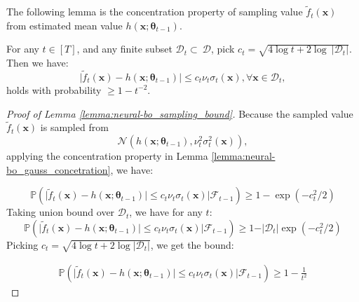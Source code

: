 The following lemma is the concentration property of sampling value $\widetilde{f}_t(\mathbf{x})$ from estimated mean value $h(\mathbf{x}; \boldsymbol{\theta}_{t-1})$.
\begin{lemma}
\label{lemma:neural-bo_sampling_bound}
For any $t \in [T]$, and any finite subset $\mathcal{D}_t \subset\ \mathcal{D}$,  pick $c_t =  \sqrt{4\log t + 2 \log \ \lvert \mathcal D_t \rvert}$. Then we have:  
\[\lvert \widetilde{f}_t(\mathbf{x}) - h(\mathbf{x}; \boldsymbol{\theta}_{t-1}) \rvert \leq c_t\nu_t \sigma_t(\mathbf{x}), \forall \mathbf{x} \in \mathcal{D}_t, \] 
holds with probability $\geq  1-t^{-2}$.
\end{lemma}


\begin{proof}[Proof of Lemma \ref{lemma:neural-bo_sampling_bound}]
    
Because the sampled value $\widetilde{f}_t(\mathbf{x})$ is sampled from  
\[
\mathcal{N}(h(\mathbf{x}; \boldsymbol{\theta}_{t-1}), \nu_t^2\sigma_t^2(\mathbf{x})),
\] 
applying the concentration property in Lemma \ref{lemma:neural-bo_gauss_concetration}, we have:

\[\mathbb{P}(\rvert \widetilde{f}_t(\mathbf{x}) -h(\mathbf{x}; \boldsymbol{\theta}_{t-1}) \lvert \leq c_t \nu_t \sigma_t(\mathbf{x}) \lvert \mathcal{F}_{t-1}) \geq 1-\exp(-c_t^2/2)
\]
Taking union bound over $\mathcal{D}_t$, we have for any $t$:
\[\mathbb{P}(\rvert \widetilde{f}_t(\mathbf{x}) - h(\mathbf{x}; \boldsymbol{\theta}_{t-1}) \lvert \leq c_t \nu_t \sigma_t(\mathbf{x}) \lvert \mathcal{F}_{t-1}) \geq 1-\rvert \mathcal{D}_t \rvert\exp(-c_t^2/2) \]
Picking $c_t = \sqrt{4 \log t + 2 \log \lvert \mathcal{D}_t \rvert}$, we get the bound:

 \begin{align*}
     \mathbb{P}(\rvert \widetilde{f}_t(\mathbf{x}) - h(\mathbf{x}; \boldsymbol{\theta}_{t-1}) \lvert \leq c_t \nu_t \sigma_t(\mathbf{x}) \lvert \mathcal{F}_{t-1}) \geq 1-\frac{1}{t^2}
 \end{align*}
\end{proof}

